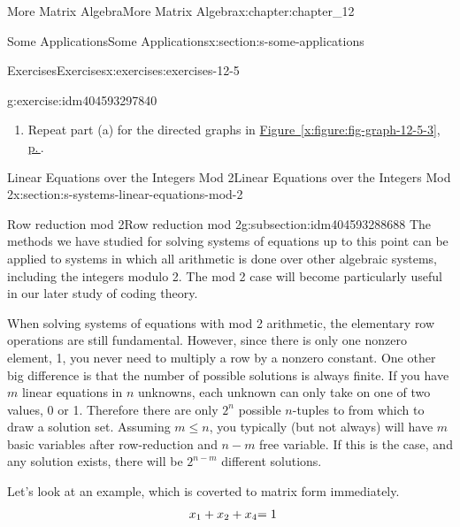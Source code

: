 \documentclass[twoside,10pt,]{book}
\newcommand{\xreffont}{\relax}
\numberwithin{equation}{section}
\begin{document}
\begin{chapterptx}{More Matrix Algebra}{}{More Matrix Algebra}{}{}{x:chapter:chapter_12}
\begin{sectionptx}{Some Applications}{}{Some Applications}{}{}{x:section:s-some-applications}
\begin{exercises-subsection}{Exercises}{}{Exercises}{}{}{x:exercises:exercises-12-5}
\begin{divisionexercise}{8}{}{}{g:exercise:idm404593297840}
\begin{enumerate}[label=(\alph*)]
\item{}Repeat part (a) for the directed graphs in \hyperref[x:figure:fig-graph-12-5-3]{Figure~{\xreffont\ref{x:figure:fig-graph-12-5-3}}, p.\,\pageref{x:figure:fig-graph-12-5-3}}.%
\end{enumerate}
%
\end{divisionexercise}%
\end{exercises-subsection}
\end{sectionptx}
%
%
\typeout{************************************************}
\typeout{************************************************}
%
\begin{sectionptx}{Linear Equations over the Integers Mod 2}{}{Linear Equations over the Integers Mod 2}{}{}{x:section:s-systems-linear-equations-mod-2}
%
%
%
\typeout{************************************************}
\typeout{************************************************}
%
\begin{subsectionptx}{Row reduction mod 2}{}{Row reduction mod 2}{}{}{g:subsection:idm404593288688}
The methods we have studied for solving systems of equations up to this point can be applied to systems in which all arithmetic is done over other algebraic systems, including the integers modulo 2.    The mod 2 case will become particularly useful in our later study of coding theory.%
\par
When solving systems of equations with mod 2 arithmetic, the elementary row operations are still fundamental.  However, since there is only one nonzero element, 1, you never need to multiply a row by a nonzero constant.   One other big difference is that the number of possible solutions is always finite.  If you have \(m\) linear equations in \(n\) unknowns, each unknown can only take on one of two values, 0 or 1.   Therefore there are only \(2^n\) possible \(n\)-tuples to from which to draw a solution set.   Assuming \(m \leq n\), you typically (but not always) will have \(m\) basic variables after row-reduction and \(n-m\) free variable.  If this is the case, and any solution exists, there will be \(2^{n-m}\) different solutions.%
\par
Let's look at an example, which is coverted to matrix form immediately.%
\begin{equation*}
\begin{array}{r@{}r@{}r@{}r@{}r@{}r@{}r@{}r@{}r@{}r@{}r@{}r@{}}
x_1 &{}+{} &x_2 &      &    &{}+{} & x_4  &      &    &     &   &= 1 \\

\end{array}
\end{equation*}
\end{subsectionptx}
\end{sectionptx}
\end{chapterptx}
\end{document}
